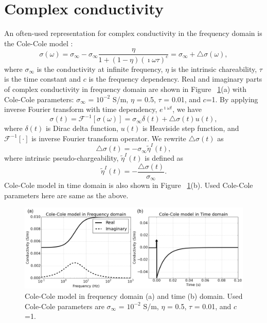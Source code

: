 \documentclass[a4paper, 11pt]{article}
\newcommand{\siginf}{\sigma_\infty}
\newcommand{\dsig}{\triangle\sigma}
\newcommand{\peta}{\tilde{\eta}}
\begin{document}
\section{Complex conductivity}
An often-used representation for complex conductivity in the frequency domain is the Cole-Cole model \cite{COLE}:
\begin{equation}
  \sigma(\omega) = \sigma_{\infty} - \sigma_{\infty}\frac{\eta}{1+(1-\eta)(\imath\omega\tau)^c} = \sigma_{\infty} + \triangle\sigma(\omega),
  \label{eq: sigma_freq}
\end{equation}
where $\sigma_{\infty}$ is the conductivity at infinite frequency, $\eta$ is the intrinsic chareability, $\tau$ is the time constant and $c$ is the frequency dependency. Real and imaginary parts of complex conductivity in frequency domain are shown in Figure ~\ref{Fig:FDandTDCole}(a) with Cole-Cole parameters: $\siginf$ = $10^{-2}$ S/m, $\eta $ = 0.5, $\tau$ = 0.01, and $c$=1. By applying inverse Fourier transform with time dependency, $e^{\imath\omega t}$, we have
\begin{equation}
  \sigma(t) = \mathscr{F}^{-1}[\sigma(\omega)] = \sigma_{\infty}\delta(t) + \triangle\sigma(t)u(t),
  \label{eq: sigma_time}
\end{equation}
where $\delta(t)$ is Dirac delta function, $u(t)$ is Heaviside step function, and $\mathscr{F}^{-1}[\cdot]$ is inverse Fourier transform operator. 
We rewrite $\dsig(t)$ as 
\begin{equation}
  \dsig(t) = - \siginf\peta^{I}(t),
  \label{eq: sigma_time_c1}
\end{equation}
where intrinsic pseudo-chargeability, $\peta^{I}(t)$ is defined as
\begin{equation}
    \peta^{I}(t) = -\frac{\dsig(t)}{\siginf}. %
    \label{eq: intrinsic_peta}
\end{equation}
Cole-Cole model in time domain is also shown in Figure ~\ref{Fig:FDandTDCole}(b). Used Cole-Cole parameters here are same as the above.

\begin{figure}
  \centering
  \includegraphics[width=1.0\textwidth]{figures/FDandTDCole.png}
  \caption{Cole-Cole model in frequency domain (a) and time (b) domain. Used Cole-Cole parameters are $\siginf$ = $10^{-2}$ S/m, $\eta $ = 0.5, $\tau$ = 0.01, and $c$=1.}
  \label{Fig:FDandTDCole}
\end{figure}
\end{document}
